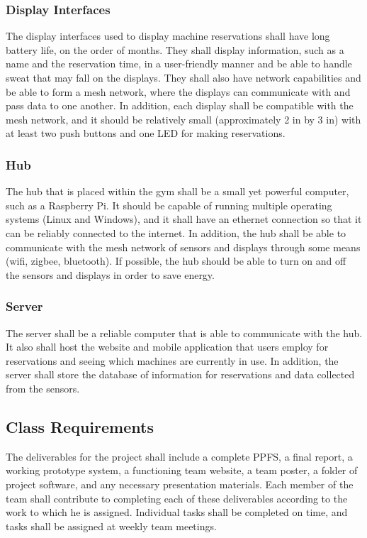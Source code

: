 \documentclass[PPFS.tex]{template/subfiles}
\begin{document}
\subsubsection{Display Interfaces}
The display interfaces used to display machine reservations shall have long battery life, on the order of months. They shall display information, such as a name and the reservation time, in a user-friendly manner and be able to handle sweat that may fall on the displays. They shall also have network capabilities and be able to form a mesh network, where the displays can communicate with and pass data to one another. In addition, each display shall be compatible with the mesh network, and it should be relatively small (approximately 2 in by 3 in) with at least two push buttons and one LED for making reservations.

\subsubsection{Hub}
The hub that is placed within the gym shall be a small yet powerful computer, such as a Raspberry Pi. It should be capable of running multiple operating systems (Linux and Windows), and it shall have an ethernet connection so that it can be reliably connected to the internet. In addition, the hub shall be able to communicate with the mesh network of sensors and displays through some means (wifi, zigbee, bluetooth). If possible, the hub should be able to turn on and off the sensors and displays in order to save energy.

\subsubsection{Server}
The server shall be a reliable computer that is able to communicate with the hub. It also shall host the website and mobile application that users employ for reservations and seeing which machines are currently in use. In addition, the server shall store the database of information for reservations and data collected from the sensors.

\subsection{Class Requirements}
The deliverables for the project shall include a complete PPFS, a final report, a working prototype system, a functioning team website, a team poster, a folder of project software, and any necessary presentation materials. Each member of the team shall contribute to completing each of these deliverables according to the work to which he is assigned. Individual tasks shall be completed on time, and tasks shall be assigned at weekly team meetings.
\end{document}
